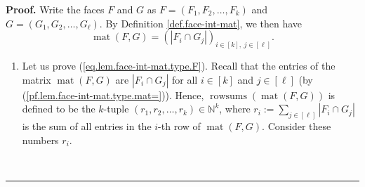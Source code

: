 \documentclass[12pt]{article}
\theoremstyle{definition}%
\theoremstyle{definition}%
\theoremstyle{remark}%
\newcommand{\interval}[1]{\left[ #1 \right]} %
\newcommand{\rowsums}{\operatorname{rowsums}}
\newcommand{\mat}{\operatorname{mat}}
\newenvironment{proof}[1][Proof]{\noindent\textbf{#1.} }{\ \rule{0.5em}{0.5em}}
\begin{document}
\begin{proof}
Write the faces $F$ and $G$ as $F=\left(  F_{1},F_{2},\ldots,F_{k}\right)  $
and $G=\left(  G_{1},G_{2},\ldots,G_{\ell}\right)  $. By Definition
\ref{def.face-int-mat}, we then have
\begin{equation}
\mat\left(  F,G\right)  =\left(  \left\vert F_{i}\cap
G_{j}\right\vert \right)  _{i\in\interval{k}  ,\ j\in\interval{\ell}
}.
\label{pf.lem.face-int-mat.type.mat=}
\end{equation}


\begin{enumerate}
\item Let us prove (\ref{eq.lem.face-int-mat.type.F}). Recall that the entries
of the matrix $\mat\left(  F,G\right)  $ are $\left\vert
F_{i}\cap G_{j}\right\vert $ for all $i\in\interval{k}  $ and $j\in
\interval{\ell}$ (by (\ref{pf.lem.face-int-mat.type.mat=})). Hence,
$\rowsums \left(  \mat\left(  F,G\right)
\right)  $ is defined to be the $k$-tuple $\left(  r_{1},r_{2},\ldots
,r_{k}\right)  \in\mathbb{N}^{k}$, where $r_{i}:=\sum_{j\in
\interval{\ell}}\left\vert F_{i}\cap G_{j}\right\vert $ is the sum of all
entries in the $i$-th row of $\mat\left(  F,G\right)  $.
Consider these numbers $r_{i}$.


\end{enumerate}
\end{proof}
\end{document}
